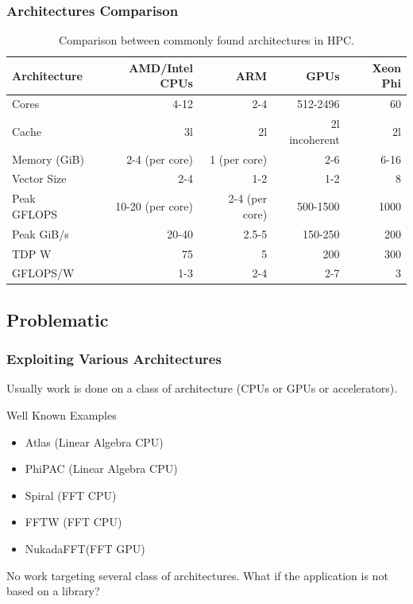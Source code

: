 \documentclass{beamer}
\begin{document}
\begin{frame}
\frametitle{Architectures Comparison}
\begin{table}
\centering
\footnotesize
\begin{tabular}{|l|r|r|r|r|}
\hline
Architecture & AMD/Intel CPUs & ARM & GPUs & Xeon Phi \\
\hline
Cores    & 4-12   & 2-4   & 512-2496    & 60  \\
\hline
Cache    & 3l & 2l & 2l incoherent & 2l \\
\hline
Memory (GiB)   & 2-4 (per core)   & 1 (per core)   & 2-6    & 6-16   \\
\hline
Vector Size   & 2-4    & 1-2    & 1-2    & 8 \\
\hline
Peak GFLOPS & 10-20 (per core)    & 2-4 (per core)   & 500-1500    & 1000\\
\hline
Peak GiB/s & 20-40 & 2.5-5 & 150-250 & 200\\
\hline
TDP W & 75  & 5 & 200 & 300\\
\hline
GFLOPS/W & 1-3 & 2-4 & 2-7 & 3\\
\hline
\end{tabular} \caption{Comparison between commonly found architectures in HPC.}
\end{table}
\end{frame}

\subsection{Problematic}

\begin{frame}
\frametitle{Exploiting Various Architectures}
Usually work is done on a class of architecture (CPUs or GPUs or accelerators).\\
\begin{block}{Well Known Examples}
\begin{itemize}
\item Atlas (Linear Algebra CPU)
\item PhiPAC (Linear Algebra CPU)
\item Spiral (FFT CPU)
\item FFTW (FFT CPU)
\item NukadaFFT(FFT GPU)
\end{itemize}
\end{block}
No work targeting several class of architectures.
What if the application is not based on a library?
\end{frame}
\end{document}

